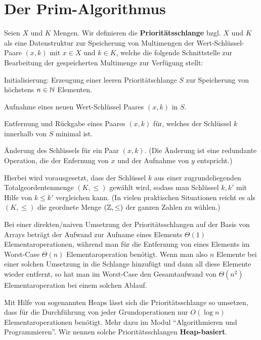 
\section{Der Prim-Algorithmus}

\begin{defn}
	Seien $X$ und $K$ Mengen. 
	Wir definieren die \textbf{Prioritätsschlange} bzgl. $X$ und $K$ als eine Datenstruktur zur Speicherung von Multimengen der Wert-Schlüssel-Paare $(x,k)$ mit $x \in X$ und $k \in K$, welche die folgende Schnittstelle zur Bearbeitung der gespeicherten Multimenge zur Verfügung stellt: 
	\begin{enuma}
			\item Initialisierung: Erzeugung einer leeren Prioritätschlange $S$ zur Speicherung von höchstens $n \in \mathbb{N}$ Elementen.
			\item Aufnahme eines neuen Wert-Schlüssel Paares $(x,k)$ in $S$. 
			\item Entfernung und Rückgabe eines Paares $(x,k)$ für, welches der Schlüssel $k$ innerhalb von $S$ minimal ist. 
			\item Änderung des Schlüssels für ein Paar $(x,k)$. (Die Änderung ist eine redundante Operation, die der Enfernung von $x$ und der Aufnahme von $y$ entspricht.) 
	\end{enuma}  
	Hierbei wird vorausgesetzt, dass der Schlüssel $k$ aus einer zugrundeliegenden Totalgeordentenmenge $(K,\le)$ gewählt wird, sodass man Schlüssel $k,k'$ mit Hilfe von $k \le k'$ vergleichen kann. (In vielen praktischen Situationen reicht es als $(K,\le)$ die geordnete Menge $(\mathbb{Z},\le)$ der ganzen Zahlen zu wählen.)
\end{defn} 


\begin{bem}
	Bei einer direkten/naiven Umsetzung der Prioritätsschlangen auf der Basis von Arrays beträgt der Aufwand zur Aufname eines Elements $\Theta(1)$ Elementaroperationen, während man für die Entfernung von eines Elements im Worst-Case $\Theta(n)$ Elementaroperation benötigt. Wenn man also $n$ Elemente bei einer solchen Umsetzung in die Schlange hinzufügt und dann all diese Elemente wieder entfernt, so hat man im Worst-Case den Gesamtaufwand von $\Theta(n^2)$ Elementaroperation bei einem solchen Ablauf.
\end{bem} 

\begin{bem}
	Mit Hilfe von sogenannten Heaps lässt sich die Prioritätsschlange so umsetzen, dass für die Durchführung von jeder Grundoperationen nur $O(\log n)$ Elementaroperationen benötigt. Mehr dazu im Modul ``Algorithmieren und Programmieren''. Wir nennen solche Prioritätsschlangen \textbf{Heap-basiert}. 
\end{bem} 

